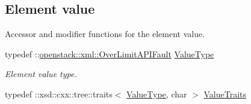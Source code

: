 \subsection*{Element value}
\label{_amgrp2ee2eae1a8c390ea033f241c027da8d6}
Accessor and modifier functions for the element value. \begin{DoxyCompactItemize}
\item 
\hypertarget{classopenstack_1_1xml_1_1OverLimit_a31f6d1d2ad0cf3c5a410d3f9e56a6705}{
typedef ::\hyperlink{classopenstack_1_1xml_1_1OverLimitAPIFault}{openstack::xml::OverLimitAPIFault} \hyperlink{classopenstack_1_1xml_1_1OverLimit_a31f6d1d2ad0cf3c5a410d3f9e56a6705}{ValueType}}
\label{classopenstack_1_1xml_1_1OverLimit_a31f6d1d2ad0cf3c5a410d3f9e56a6705}

\begin{DoxyCompactList}\small\item\em Element value type. \item\end{DoxyCompactList}\item 
\hypertarget{classopenstack_1_1xml_1_1OverLimit_a4039d0cbc90b852fb8ba46b15a7b8880}{
typedef ::xsd::cxx::tree::traits$<$ \hyperlink{classopenstack_1_1xml_1_1OverLimitAPIFault}{ValueType}, char $>$ \hyperlink{classopenstack_1_1xml_1_1OverLimit_a4039d0cbc90b852fb8ba46b15a7b8880}{ValueTraits}}
\label{classopenstack_1_1xml_1_1OverLimit_a4039d0cbc90b852fb8ba46b15a7b8880}


\end{DoxyCompactItemize}
